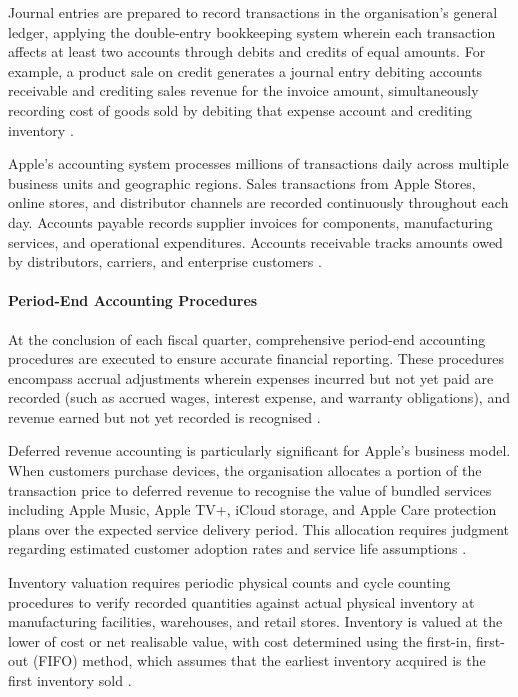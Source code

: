 \documentclass[12pt,a4paper]{article}
\begin{document}
Journal entries are prepared to record transactions in the organisation's general ledger, applying the double-entry bookkeeping system wherein each transaction affects at least two accounts through debits and credits of equal amounts. For example, a product sale on credit generates a journal entry debiting accounts receivable and crediting sales revenue for the invoice amount, simultaneously recording cost of goods sold by debiting that expense account and crediting inventory \citep{kieso2023}.

Apple's accounting system processes millions of transactions daily across multiple business units and geographic regions. Sales transactions from Apple Stores, online stores, and distributor channels are recorded continuously throughout each day. Accounts payable records supplier invoices for components, manufacturing services, and operational expenditures. Accounts receivable tracks amounts owed by distributors, carriers, and enterprise customers \citep{apple202410k}.

\paragraph{Period-End Accounting Procedures}

At the conclusion of each fiscal quarter, comprehensive period-end accounting procedures are executed to ensure accurate financial reporting. These procedures encompass accrual adjustments wherein expenses incurred but not yet paid are recorded (such as accrued wages, interest expense, and warranty obligations), and revenue earned but not yet recorded is recognised \citep{kieso2023}.

Deferred revenue accounting is particularly significant for Apple's business model. When customers purchase devices, the organisation allocates a portion of the transaction price to deferred revenue to recognise the value of bundled services including Apple Music, Apple TV+, iCloud storage, and Apple Care protection plans over the expected service delivery period. This allocation requires judgment regarding estimated customer adoption rates and service life assumptions \citep{apple202410k}.

Inventory valuation requires periodic physical counts and cycle counting procedures to verify recorded quantities against actual physical inventory at manufacturing facilities, warehouses, and retail stores. Inventory is valued at the lower of cost or net realisable value, with cost determined using the first-in, first-out (FIFO) method, which assumes that the earliest inventory acquired is the first inventory sold \citep{apple202410k}.
\end{document}
